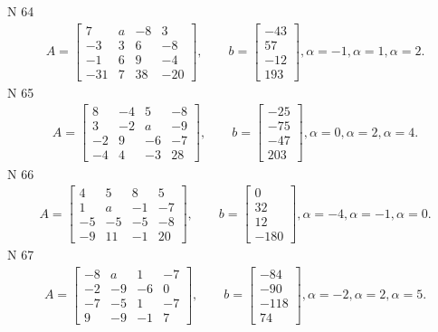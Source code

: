 \documentclass[11pt]{report}
\begin{document}
N 64
\begin{align*}
 A = \left[\begin{matrix}7 & a & -8 & 3\\-3 & 3 & 6 & -8\\-1 & 6 & 9 & -4\\-31 & 7 & 38 & -20\end{matrix}\right],
    \qquad b = \left[\begin{matrix}-43\\57\\-12\\193\end{matrix}\right], \alpha = -1, \alpha = 1, \alpha = 2. 
 \end{align*}
N 65
\begin{align*}
 A = \left[\begin{matrix}8 & -4 & 5 & -8\\3 & -2 & a & -9\\-2 & 9 & -6 & -7\\-4 & 4 & -3 & 28\end{matrix}\right],
    \qquad b = \left[\begin{matrix}-25\\-75\\-47\\203\end{matrix}\right], \alpha = 0, \alpha = 2, \alpha = 4. 
 \end{align*}
N 66
\begin{align*}
 A = \left[\begin{matrix}4 & 5 & 8 & 5\\1 & a & -1 & -7\\-5 & -5 & -5 & -8\\-9 & 11 & -1 & 20\end{matrix}\right],
    \qquad b = \left[\begin{matrix}0\\32\\12\\-180\end{matrix}\right], \alpha = -4, \alpha = -1, \alpha = 0. 
 \end{align*}
N 67
\begin{align*}
 A = \left[\begin{matrix}-8 & a & 1 & -7\\-2 & -9 & -6 & 0\\-7 & -5 & 1 & -7\\9 & -9 & -1 & 7\end{matrix}\right],
    \qquad b = \left[\begin{matrix}-84\\-90\\-118\\74\end{matrix}\right], \alpha = -2, \alpha = 2, \alpha = 5. 
 \end{align*}
\end{document}
